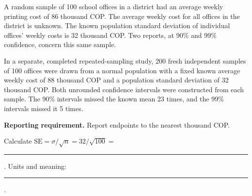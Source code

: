 A random sample of 100 school offices in a district had an average weekly printing cost of 86 thousand COP. The average weekly cost for all offices in the district is unknown. The known population standard deviation of individual offices' weekly costs is 32 thousand COP. Two reports, at 90\% and 99\% confidence, concern this same sample.

In a separate, completed repeated-sampling study, 200 fresh independent samples of 100 offices were drawn from a normal population with a fixed known average weekly cost of 88 thousand COP and a population standard deviation of 32 thousand COP. Both unrounded confidence intervals were constructed from each sample. The 90\% intervals missed the known mean 23 times, and the 99\% intervals missed it 5 times.

\textbf{Reporting requirement.} Report endpoints to the nearest thousand COP.


\par\noindent\begin{minipage}[t]{.49\linewidth}
\vspace{0pt}
\end{minipage}\hfill
\begin{minipage}[t]{.49\linewidth}
\vspace{0pt}
\end{minipage}\par
Calculate $\mathrm{SE}=\sigma/\sqrt n=32/\sqrt{100}=$ \rule{.7in}{.3pt}. Units and meaning: \rule{1.8in}{.3pt}.



